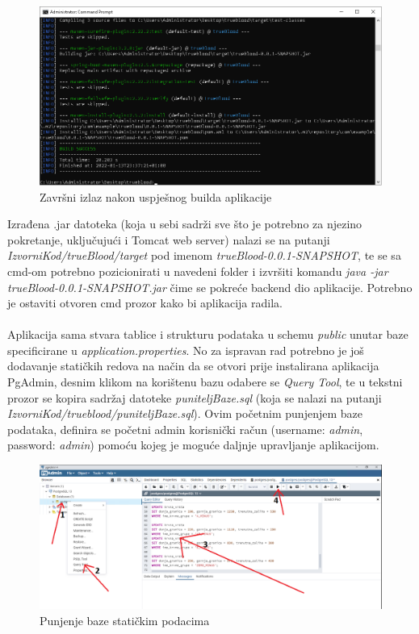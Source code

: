 			\begin{figure}[H]
			\centering
			\includegraphics[width=\textwidth]{slike/cmdBuildFinished}
			\caption{Završni izlaz nakon uspješnog builda aplikacije}
			\label{fig:cmdBuildFinished}
			\end{figure}
			\eject
			Izrađena .jar datoteka (koja u sebi sadrži sve što je potrebno za njezino pokretanje, uključujući i Tomcat web server) nalazi se na putanji \textit{IzvorniKod/trueBlood/target} pod imenom \textit{trueBlood-0.0.1-SNAPSHOT}, te se sa cmd-om potrebno pozicionirati u navedeni folder i izvršiti komandu \textit{java -jar trueBlood-0.0.1-SNAPSHOT.jar} čime se pokreće backend dio aplikacije. Potrebno je ostaviti otvoren cmd prozor kako bi aplikacija radila.\\\\
			
			Aplikacija sama stvara tablice i strukturu podataka u schemu \textit{public} unutar baze specificirane u \textit{application.properties}. No za ispravan rad potrebno je još dodavanje statičkih redova na način da se otvori prije instalirana aplikacija PgAdmin, desnim klikom na korištenu bazu odabere se \textit{Query Tool}, te u tekstni prozor se kopira sadržaj datoteke \textit{puniteljBaze.sql} (koja se nalazi na putanji \textit{IzvorniKod/trueblood/puniteljBaze.sql}). Ovim početnim punjenjem baze podataka, definira se početni admin korisnički račun (username: \textit{admin}, password: \textit{admin}) pomoću kojeg je moguće daljnje upravljanje aplikacijom.
			
			\begin{figure}[H]
			\centering
			\includegraphics[width=\textwidth, scale=0.5]{slike/puniteljBaze}
			\caption{Punjenje baze statičkim podacima}
			\label{fig:puniteljBaze}
			\end{figure}
			\eject
